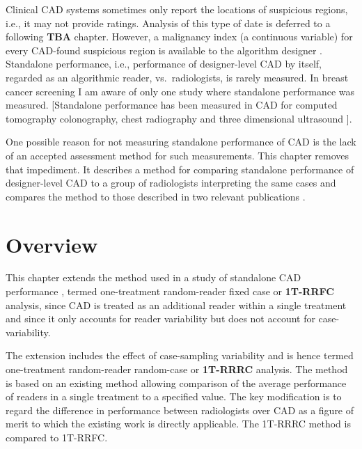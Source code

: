 \documentclass[
]{book}
\begin{document}
Clinical CAD systems sometimes only report the locations of suspicious regions, i.e., it may not provide ratings. Analysis of this type of date is deferred to a following \textbf{TBA} chapter. However, a malignancy index (a continuous variable) for every CAD-found suspicious region is available to the algorithm designer \citep{edwards2002maximum}. Standalone performance, i.e., performance of designer-level CAD by itself, regarded as an algorithmic reader, vs.~radiologists, is rarely measured. In breast cancer screening I am aware of only one study \citep{hupse2013standalone} where standalone performance was measured. {[}Standalone performance has been measured in CAD for computed tomography colonography, chest radiography and three dimensional ultrasound \citep{hein2010computeraided, summers2008performance, taylor2006computerassisted, deBoo2011computeraided, tan2012computeraided}{]}.

One possible reason for not measuring standalone performance of CAD is the lack of an accepted assessment method for such measurements. This chapter removes that impediment. It describes a method for comparing standalone performance of designer-level CAD to a group of radiologists interpreting the same cases and compares the method to those described in two relevant publications \citep{hupse2013standalone, kooi2016comparison}.

\hypertarget{standalone-cad-radiologists-overview}{%
\section{Overview}\label{standalone-cad-radiologists-overview}}

This chapter extends the method used in a study of standalone CAD performance \citep{hupse2013standalone}, termed one-treatment random-reader fixed case or \textbf{1T-RRFC} analysis, since CAD is treated as an additional reader within a single treatment and since it only accounts for reader variability but does not account for case-variability.

The extension includes the effect of case-sampling variability and is hence termed one-treatment random-reader random-case or \textbf{1T-RRRC} analysis. The method is based on an existing method allowing comparison of the average performance of readers in a single treatment to a specified value. The key modification is to regard the difference in performance between radiologists over CAD as a figure of merit to which the existing work is directly applicable. The 1T-RRRC method is compared to 1T-RRFC.
\end{document}
